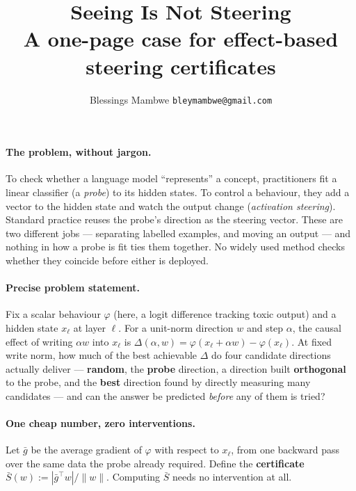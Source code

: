 \documentclass[9pt]{extarticle}
\title{\vspace{-2.4em}\textbf{\large Seeing Is Not Steering}\\[-0.1em]
{\normalsize A one-page case for effect-based steering certificates}\vspace{-1.6em}}
\author{\normalsize Blessings Mambwe \quad \texttt{bleymambwe@gmail.com}\vspace{-2.6em}}
\date{}
\newcommand{\Sbar}{\bar{S}}
\newcommand{\gbar}{\bar{g}}
\begin{document}
\twocolumn[
  \maketitle
  \vspace{-1.2em}
]

\paragraph{The problem, without jargon.} To check whether a language model
``represents'' a concept, practitioners fit a linear classifier (a
\emph{probe}) to its hidden states. To control a behaviour, they add a
vector to the hidden state and watch the output change (\emph{activation
steering}). Standard practice reuses the probe's direction as the steering
vector. These are two different jobs --- separating labelled examples, and
moving an output --- and nothing in how a probe is fit ties them together.
No widely used method checks whether they coincide before either is
deployed.

\paragraph{Precise problem statement.} Fix a scalar behaviour $\varphi$
(here, a logit difference tracking toxic output) and a hidden state
$x_\ell$ at layer $\ell$. For a unit-norm direction $w$ and step $\alpha$,
the causal effect of writing $\alpha w$ into $x_\ell$ is
$\Delta(\alpha,w)=\varphi(x_\ell+\alpha w)-\varphi(x_\ell)$. At fixed write
norm, how much of the best achievable $\Delta$ do four candidate
directions actually deliver --- \textbf{random}, the \textbf{probe}
direction, a direction built \textbf{orthogonal} to the probe, and the
\textbf{best} direction found by directly measuring many candidates --- and
can the answer be predicted \emph{before} any of them is tried?

\paragraph{One cheap number, zero interventions.} Let $\gbar$ be the average
gradient of $\varphi$ with respect to $x_\ell$, from one backward pass over
the same data the probe already required. Define the \textbf{certificate}
$\Sbar(w) := |\gbar^\top w|/\|w\|$. Computing $\Sbar$ needs no intervention
at all.
\end{document}
